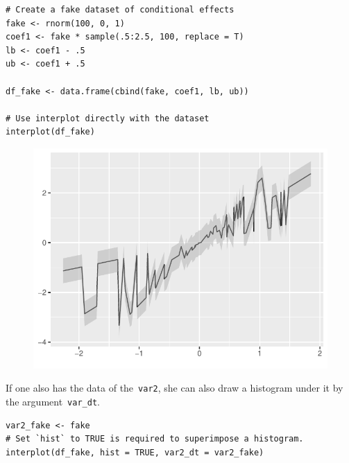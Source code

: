 \documentclass[
  article]{jss}
\begin{document}
\begin{verbatim}
# Create a fake dataset of conditional effects
fake <- rnorm(100, 0, 1)
coef1 <- fake * sample(.5:2.5, 100, replace = T)
lb <- coef1 - .5
ub <- coef1 + .5

df_fake <- data.frame(cbind(fake, coef1, lb, ub))

# Use interplot directly with the dataset
interplot(df_fake)
\end{verbatim}

\begin{figure}[H]

{\centering \includegraphics{jss_manuscript_files/figure-pdf/unnamed-chunk-19-1.pdf}

}

\end{figure}

If one also has the data of the~\texttt{var2}, she can also draw a
histogram under it by the argument~\texttt{var\_dt}.

\begin{verbatim}
var2_fake <- fake
# Set `hist` to TRUE is required to superimpose a histogram.
interplot(df_fake, hist = TRUE, var2_dt = var2_fake)
\end{verbatim}
\end{document}
